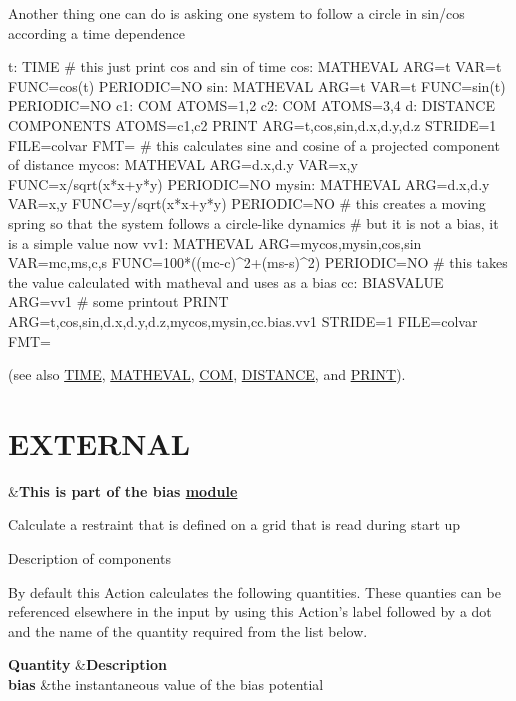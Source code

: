 Another thing one can do is asking one system to follow a circle in sin/cos according a time dependence

\begin{DoxyVerb}t: TIME
# this just print cos and sin of time
cos: MATHEVAL ARG=t VAR=t FUNC=cos(t) PERIODIC=NO 
sin: MATHEVAL ARG=t VAR=t FUNC=sin(t) PERIODIC=NO
c1: COM ATOMS=1,2
c2: COM ATOMS=3,4
d: DISTANCE COMPONENTS ATOMS=c1,c2
PRINT ARG=t,cos,sin,d.x,d.y,d.z STRIDE=1 FILE=colvar FMT=%
# this calculates sine and cosine of a projected component of distance
mycos:  MATHEVAL ARG=d.x,d.y  VAR=x,y   FUNC=x/sqrt(x*x+y*y) PERIODIC=NO
mysin:  MATHEVAL ARG=d.x,d.y  VAR=x,y   FUNC=y/sqrt(x*x+y*y) PERIODIC=NO
# this creates a moving spring so that the system follows a circle-like dynamics 
# but it is not a bias, it is a simple value now
vv1:  MATHEVAL ARG=mycos,mysin,cos,sin VAR=mc,ms,c,s  FUNC=100*((mc-c)^2+(ms-s)^2) PERIODIC=NO
# this takes the value calculated with matheval and uses as a bias 
cc: BIASVALUE ARG=vv1 
# some printout
PRINT ARG=t,cos,sin,d.x,d.y,d.z,mycos,mysin,cc.bias.vv1 STRIDE=1 FILE=colvar FMT=%
\end{DoxyVerb}
 (see also \hyperlink{TIME}{T\+I\+M\+E}, \hyperlink{MATHEVAL}{M\+A\+T\+H\+E\+V\+A\+L}, \hyperlink{COM}{C\+O\+M}, \hyperlink{DISTANCE}{D\+I\+S\+T\+A\+N\+C\+E}, and \hyperlink{PRINT}{P\+R\+I\+N\+T}). \hypertarget{EXTERNAL}{}\section{E\+X\+T\+E\+R\+N\+A\+L}\label{EXTERNAL}
\begin{TabularC}{2}
\hline
&{\bfseries  This is part of the bias \hyperlink{mymodules}{module }}   \\
\end{TabularC}
Calculate a restraint that is defined on a grid that is read during start up

\begin{DoxyParagraph}{Description of components}

\end{DoxyParagraph}
By default this Action calculates the following quantities. These quanties can be referenced elsewhere in the input by using this Action's label followed by a dot and the name of the quantity required from the list below.

\begin{TabularC}{2}
\hline
{\bfseries  Quantity }  &{\bfseries  Description }   \\
{\bfseries  bias } &the instantaneous value of the bias potential   \\
\end{TabularC}


